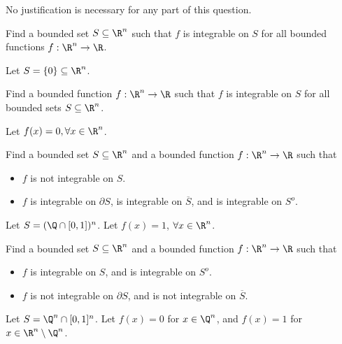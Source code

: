 \documentclass{exam}
\begin{document}
\begin{questions}


\question  No justification is necessary for any part of this question. 

\begin{parts}

\item Find a bounded set $S \subseteq \R^n$ such that $f$ is integrable on $S$ for all bounded functions $f : \R^n \to \R$. 
\begin{answer}{80pt}
Let $S = \{0\} \subseteq \R^n$.
\end{answer}
	
\item Find a bounded function $f : \R^n \to \R$ such that $f$ is integrable on $S$ for all bounded sets $S \subseteq \R^n$.  
\begin{answer}{80pt}
Let $f(x) = 0, \forall x \in \R^n$.
\end{answer}


\item Find a bounded set $S \subseteq \R^n$ and a bounded function $f : \R^n \to \R$ such that 
\begin{itemize}
	\item $f$ is not integrable on $S$.
	\item $f$ is integrable on $\partial S$, is integrable on $\overline{S}$, and is integrable on $S^o$. 
\end{itemize}
\begin{answer}{120pt}
Let $S = (\Q \cap [0,1])^n$. Let $f(x) = 1$, $\forall x \in \R^n$.
\end{answer}


\item Find a bounded set $S \subseteq \R^n$ and a bounded function $f : \R^n \to \R$ such that 
\begin{itemize}
	\item $f$ is integrable on $S$, and is integrable on $S^o$.
	\item $f$ is not integrable on $\partial S$, and is not integrable on $\overline{S}$. 
\end{itemize}
\begin{answer}{120pt}
Let $S = \Q^n \cap [0,1]^n$. Let $f(x) = 0$ for $x \in \Q^n$, and $f(x) = 1$ for $x \in \R^n \setminus \Q^n$.
\end{answer}


\end{parts}
\end{questions}
\end{document}
